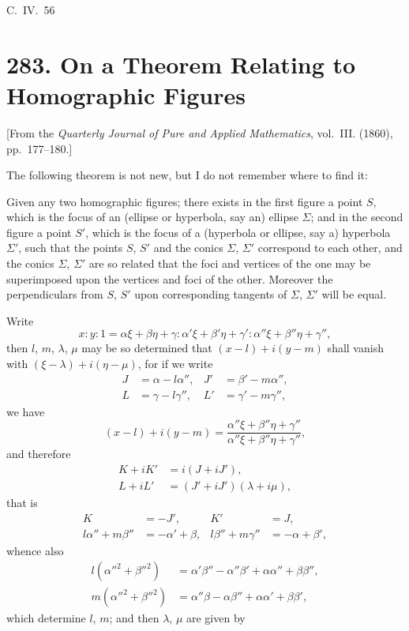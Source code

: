 \documentclass[11pt,a4paper]{book}
\begin{document}
\hfill C.~IV.\ 56



\newpage
\section*{283. On a Theorem Relating to Homographic Figures}
\label{sec:283}

[From the \textit{Quarterly Journal of Pure and Applied Mathematics}, vol.~III. (1860), pp.~177--180.]

The following theorem is not new, but I do not remember where to find it:

Given any two homographic figures; there exists in the first figure a point $S$, which is the focus of an (ellipse or hyperbola, say an) ellipse $\Sigma$; and in the second figure a point $S'$, which is the focus of a (hyperbola or ellipse, say a) hyperbola $\Sigma'$, such that the points $S$, $S'$ and the conics $\Sigma$, $\Sigma'$ correspond to each other, and the conics $\Sigma$, $\Sigma'$ are so related that the foci and vertices of the one may be superimposed upon the vertices and foci of the other. Moreover the perpendiculars from $S$, $S'$ upon corresponding tangents of $\Sigma$, $\Sigma'$ will be equal.

Write
\[
x : y : 1 = \alpha\xi + \beta\eta + \gamma : \alpha'\xi + \beta'\eta + \gamma' : \alpha''\xi + \beta''\eta + \gamma'',
\]
then $l$, $m$, $\lambda$, $\mu$ may be so determined that $(x - l) + i(y - m)$ shall vanish with $(\xi - \lambda) + i(\eta - \mu)$, for if we write
\begin{align*}
J &= \alpha - l\alpha'', & J' &= \beta' - m\alpha'',\\
L &= \gamma - l\gamma'', & L' &= \gamma' - m\gamma'',
\end{align*}
we have
\[
(x - l) + i(y - m) = \frac{\alpha''\xi + \beta''\eta + \gamma''}{\alpha''\xi + \beta''\eta + \gamma''},
\]
and therefore
\begin{align*}
K + iK' &= i(J + iJ'),\\
L + iL' &= (J' + iJ')(\lambda + i\mu),
\end{align*}
that is
\begin{align*}
K &= -J', & K' &= J,\\
l\alpha'' + m\beta'' &= -\alpha' + \beta, & l\beta'' + m\gamma'' &= -\alpha + \beta',
\end{align*}
whence also
\begin{align*}
l(\alpha''^2 + \beta''^2) &= \alpha'\beta'' - \alpha''\beta' + \alpha\alpha'' + \beta\beta'',\\
m(\alpha''^2 + \beta''^2) &= \alpha''\beta - \alpha\beta'' + \alpha\alpha' + \beta\beta',
\end{align*}
which determine $l$, $m$; and then $\lambda$, $\mu$ are given by
\end{document}
